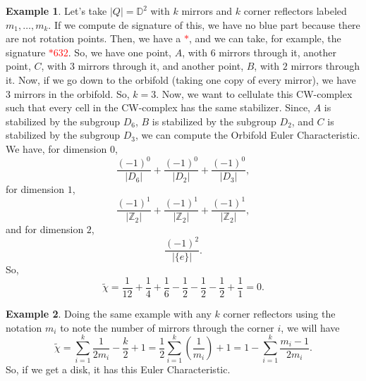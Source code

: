 \documentclass[12pt,a4paper,oneside]{article}
\numberwithin{equation}{section}
\theoremstyle{definition}
\newtheorem{example}{Example}
\begin{document}
\begin{example} Let's take $\vert Q \vert = \mathbb{D}^{2}$ with $k$ mirrors and $k$ corner reflectors  labeled $m_{1}, \ldots, m_{k}$. \newline
If we compute de signature of this, we have no blue part because there are not rotation points. Then, we have a \textcolor{red}{$*$}, and we can take, for example, the signature \textcolor{red}{$*632$}. So, we have one point, $A$, with $6$ mirrors through it, another point, $C$, with $3$ mirrors through it, and another point, $B$, with $2$ mirrors through it. Now, if we go down to the orbifold (taking one copy of every mirror), we have $3$ mirrors in the orbifold. So, $k = 3$. Now, we want to cellulate this CW-complex such that every cell in the CW-complex has the same stabilizer. Since, $A$ is stabilized by the subgroup $D_{6}$, $B$ is stabilized by the subgroup $D_{2}$, and $C$ is stabilized by the subgroup $D_{3}$, we can compute the Orbifold Euler Characteristic. \newline
We have, for dimension $0$, $$\frac{(-1)^{0}}{\vert D_{6} \vert} + \frac{(-1)^{0}}{\vert D_{2} \vert} + \frac{(-1)^{0}}{\vert D_{3} \vert},$$ for dimension $1$, $$\frac{(-1)^{1}}{\vert \mathbb{Z}_{2} \vert} + \frac{(-1)^{1}}{\vert \mathbb{Z}_{2} \vert} + \frac{(-1)^{1}}{\vert \mathbb{Z}_{2} \vert},$$ and for dimension $2$, $$\frac{(-1)^{2}}{\vert \lbrace e \rbrace \vert}.$$ \newline
So, $$\tilde{\chi} = \frac{1}{12} + \frac{1}{4} + \frac{1}{6} - \frac{1}{2} - \frac{1}{2} - \frac{1}{2} + \frac{1}{1} = 0.$$
\end{example}

\begin{example} Doing the same example with any $k$ corner reflectors using the notation $m_{i}$ to note the number of mirrors through the corner $i$, we will have $$\tilde{\chi} = \sum_{i = 1}^{k} \frac{1}{2 m_{i}} - \frac{k}{2} + 1 = \frac{1}{2} \sum_{i = 1}^{k} \left(\frac{1}{m_{i}}\right) + 1 = 1 - \sum_{i=1}^{k} \frac{m_{i} - 1}{2 m_{i}}.$$ So, if we get a disk, it has this Euler Characteristic.
\end{example}
\end{document}
